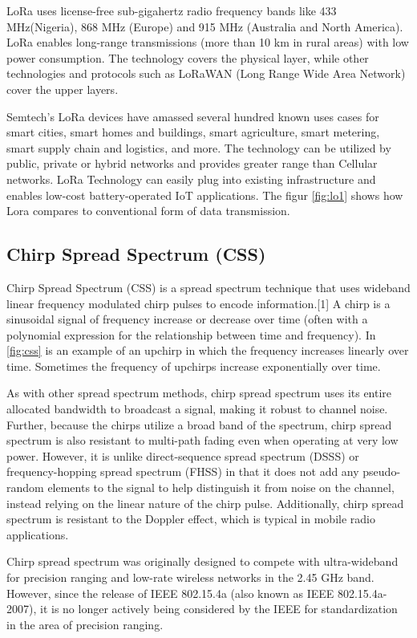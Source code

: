 LoRa uses license-free sub-gigahertz radio frequency bands like 433 MHz(Nigeria), 868 MHz (Europe) and 915 MHz (Australia and North America). LoRa enables long-range transmissions (more than 10 km in rural areas) with low power consumption. The technology covers the physical layer, while other technologies and protocols such as LoRaWAN (Long Range Wide Area Network) cover the upper layers. 

Semtech’s LoRa devices have amassed several hundred known uses cases for smart cities, smart homes and buildings, smart agriculture, smart metering, smart supply chain and logistics, and more. The technology can be utilized by public, private or hybrid networks and provides greater range than Cellular networks. LoRa Technology can easily plug into existing infrastructure and enables low-cost battery-operated IoT applications. The figur \ref{fig:lo1} shows how Lora compares to conventional form of data transmission. 

\subsection{Chirp Spread Spectrum (CSS)}
Chirp Spread Spectrum (CSS) is a spread spectrum technique that uses wideband linear frequency modulated chirp pulses to encode information.[1] A chirp is a sinusoidal signal of frequency increase or decrease over time (often with a polynomial expression for the relationship between time and frequency). In \ref{fig:css} is an example of an upchirp in which the frequency increases linearly over time. Sometimes the frequency of upchirps increase exponentially over time. 

As with other spread spectrum methods, chirp spread spectrum uses its entire allocated bandwidth to broadcast a signal, making it robust to channel noise. Further, because the chirps utilize a broad band of the spectrum, chirp spread spectrum is also resistant to multi-path fading even when operating at very low power. However, it is unlike direct-sequence spread spectrum (DSSS) or frequency-hopping spread spectrum (FHSS) in that it does not add any pseudo-random elements to the signal to help distinguish it from noise on the channel, instead relying on the linear nature of the chirp pulse. Additionally, chirp spread spectrum is resistant to the Doppler effect, which is typical in mobile radio applications.

Chirp spread spectrum was originally designed to compete with ultra-wideband for precision ranging and low-rate wireless networks in the 2.45 GHz band. However, since the release of IEEE 802.15.4a (also known as IEEE 802.15.4a-2007), it is no longer actively being considered by the IEEE for standardization in the area of precision ranging.


